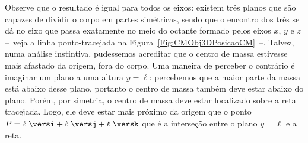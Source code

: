 \noindent{}Observe que o resultado é igual para todos os eixos: existem três planos que são capazes de dividir o corpo em partes simétricas, sendo que o encontro dos três se dá no eixo que passa exatamente no meio do octante formado pelos eixos $x$, $y$ e $z$ --~veja a linha ponto-tracejada na Figura~\ref{Fig:CMObj3DPosicaoCM}~--. Talvez, numa análise instintiva, pudessemos acreditar que o centro de massa estivesse mais afastado da origem, fora do corpo. Uma maneira de perceber o contrário é imaginar um plano a uma altura $y = \ell$: percebemos que a maior parte da massa está abaixo desse plano, portanto o centro de massa também deve estar abaixo do plano. Porém, por simetria, o centro de massa deve estar localizado sobre a reta tracejada. Logo, ele deve estar mais próximo da origem que o ponto $P = \ell \; \versi + \ell \; \versj + \ell \; \versk$ que é a interseção entre o plano $y = \ell$ e a reta. 

